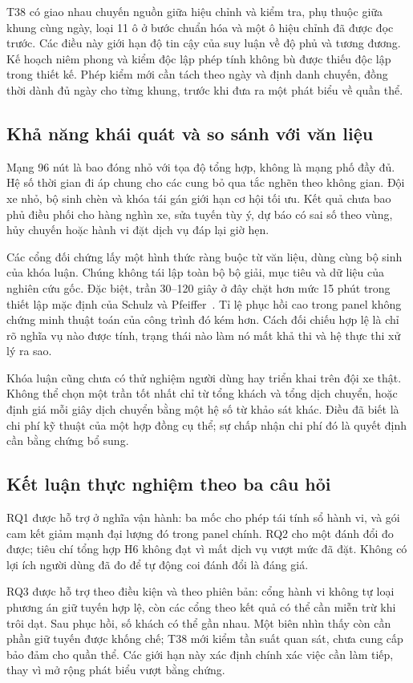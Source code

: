 T38 có giao nhau chuyến nguồn giữa hiệu chỉnh và kiểm tra, phụ thuộc giữa
khung cùng ngày, loại 11 ô ở bước chuẩn hóa và một ô hiệu chỉnh đã được
đọc trước. Các điều này giới hạn độ tin cậy của suy luận về độ phủ và
tương đương. Kế hoạch niêm phong và kiểm độc lập phép tính không bù được
thiếu độc lập trong thiết kế. Phép kiểm mới cần tách theo ngày và định
danh chuyến, đồng thời dành đủ ngày cho từng khung, trước khi đưa ra một
phát biểu về quần thể.

\subsection{Khả năng khái quát và so sánh với văn liệu}

Mạng 96 nút là bao đóng nhỏ với tọa độ tổng hợp, không là mạng phố đầy đủ.
Hệ số thời gian đi áp chung cho các cung bỏ qua tắc nghẽn theo không gian.
Đội xe nhỏ, bộ sinh chèn và khóa tái gán giới hạn cơ hội tối ưu. Kết quả
chưa bao phủ điều phối cho hàng nghìn xe, sửa tuyến tùy ý, dự báo có sai số
theo vùng, hủy chuyến hoặc hành vi đặt dịch vụ đáp lại giờ hẹn.

Các cổng đối chứng lấy một hình thức ràng buộc từ văn liệu, dùng cùng bộ
sinh của khóa luận. Chúng không tái lập toàn bộ bộ giải, mục tiêu và dữ
liệu của nghiên cứu gốc. Đặc biệt, trần 30--120 giây ở đây chặt hơn mức
15 phút trong thiết lập mặc định của Schulz và Pfeiffer~\cite{schulz2026}.
Tỉ lệ phục hồi cao trong panel không chứng minh thuật toán của công trình
đó kém hơn. Cách đối chiếu hợp lệ là chỉ rõ nghĩa vụ nào được tính, trạng
thái nào làm nó mất khả thi và hệ thực thi xử lý ra sao.

Khóa luận cũng chưa có thử nghiệm người dùng hay triển khai trên đội xe
thật. Không thể chọn một trần tốt nhất chỉ từ tổng khách và tổng dịch
chuyển, hoặc định giá mỗi giây dịch chuyển bằng một hệ số từ khảo sát
khác. Điều đã biết là chi phí kỹ thuật của một hợp đồng cụ thể; sự chấp
nhận chi phí đó là quyết định cần bằng chứng bổ sung.

\subsection{Kết luận thực nghiệm theo ba câu hỏi}

RQ1 được hỗ trợ ở nghĩa vận hành: ba mốc cho phép tái tính sổ hành vi, và
gói cam kết giảm mạnh đại lượng đó trong panel chính. RQ2 cho một đánh
đổi đo được; tiêu chí tổng hợp H6 không đạt vì mất dịch vụ vượt mức đã
đặt. Không có lợi ích người dùng đã đo để tự động coi đánh đổi là đáng giá.

RQ3 được hỗ trợ theo điều kiện và theo phiên bản: cổng hành vi không tự
loại phương án giữ tuyến hợp lệ, còn các cổng theo kết quả có thể cần
miễn trừ khi trôi dạt. Sau phục hồi, số khách có thể gần nhau. Một biên
nhìn thấy còn cần phần giữ tuyến được khống chế; T38 mới kiểm tần suất
quan sát, chưa cung cấp bảo đảm cho quần thể. Các giới hạn này xác định
chính xác việc cần làm tiếp, thay vì mở rộng phát biểu vượt bằng chứng.
